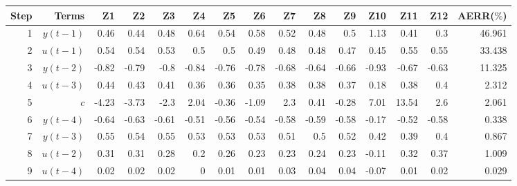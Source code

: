 \begin{tabular}{rrrrrrrrrrrrrrr}
Step & Terms & Z1 & Z2 & Z3 & Z4 & Z5 & Z6 & Z7 & Z8 & Z9 & Z10 & Z11 & Z12 & AERR($\%$) \\ 
\hline 
1 & $y(t-1)$ & 0.46 & 0.44 & 0.48 & 0.64 & 0.54 & 0.58 & 0.52 & 0.48 & 0.5 & 1.13 & 0.41 & 0.3 & 46.961 \\ 
2 & $u(t-1)$ & 0.54 & 0.54 & 0.53 & 0.5 & 0.5 & 0.49 & 0.48 & 0.48 & 0.47 & 0.45 & 0.55 & 0.55 & 33.438 \\ 
3 & $y(t-2)$ & -0.82 & -0.79 & -0.8 & -0.84 & -0.76 & -0.78 & -0.68 & -0.64 & -0.66 & -0.93 & -0.67 & -0.63 & 11.325 \\ 
4 & $u(t-3)$ & 0.44 & 0.43 & 0.41 & 0.36 & 0.36 & 0.35 & 0.38 & 0.38 & 0.37 & 0.18 & 0.38 & 0.4 & 2.312 \\ 
5 & $c$ & -4.23 & -3.73 & -2.3 & 2.04 & -0.36 & -1.09 & 2.3 & 0.41 & -0.28 & 7.01 & 13.54 & 2.6 & 2.061 \\ 
6 & $y(t-4)$ & -0.64 & -0.63 & -0.61 & -0.51 & -0.56 & -0.54 & -0.58 & -0.59 & -0.58 & -0.17 & -0.52 & -0.58 & 0.338 \\ 
7 & $y(t-3)$ & 0.55 & 0.54 & 0.55 & 0.53 & 0.53 & 0.53 & 0.51 & 0.5 & 0.52 & 0.42 & 0.39 & 0.4 & 0.867 \\ 
8 & $u(t-2)$ & 0.31 & 0.31 & 0.28 & 0.2 & 0.26 & 0.23 & 0.23 & 0.24 & 0.23 & -0.11 & 0.32 & 0.37 & 1.009 \\ 
9 & $u(t-4)$ & 0.02 & 0.02 & 0.02 & 0 & 0.01 & 0.01 & 0.03 & 0.04 & 0.04 & -0.07 & 0.01 & 0.02 & 0.029 \\ 
\hline 
\end{tabular}